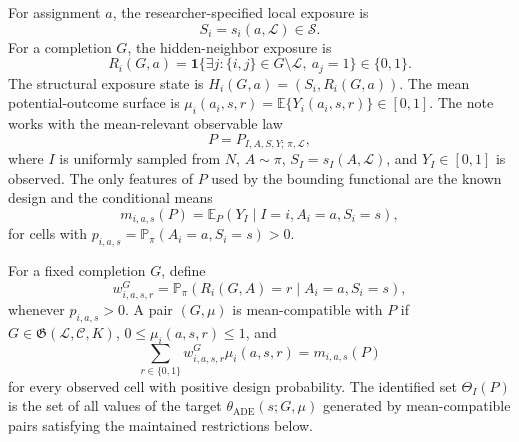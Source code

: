 \documentclass[11pt]{article}
\newcommand{\E}{\mathbb{E}}
\renewcommand{\Pr}{\mathbb{P}}
\newcommand{\one}{\mathbf{1}}
\theoremstyle{definition}
\theoremstyle{plain}
\theoremstyle{remark}
\begin{document}
For assignment \(a\), the researcher-specified local exposure is
\[
S_i=s_i(a,\mathcal L)\in\mathcal S.
\]
For a completion \(G\), the hidden-neighbor exposure is
\[
R_i(G,a)=
\one\{\exists j:\{i,j\}\in G\setminus\mathcal L,\ a_j=1\}\in\{0,1\}.
\]
The structural exposure state is \(H_i(G,a)=(S_i,R_i(G,a))\).  The mean
potential-outcome surface is
\(\mu_i(a_i,s,r)=\E\{Y_i(a_i,s,r)\}\in[0,1]\).  The note works with the
mean-relevant observable law
\[
P=P_{I,A,S,Y;\,\pi,\mathcal L},
\]
where \(I\) is uniformly sampled from \(N\), \(A\sim\pi\), \(S_I=s_I(A,\mathcal L)\),
and \(Y_I\in[0,1]\) is observed.  The only features of \(P\) used by the
bounding functional are the known design and the conditional means
\[
m_{i,a,s}(P)=\E_P(Y_I\mid I=i,A_i=a,S_i=s),
\]
for cells with \(p_{i,a,s}=\Pr_\pi(A_i=a,S_i=s)>0\).

For a fixed completion \(G\), define
\[
w^G_{i,a,s,r}
=\Pr_\pi(R_i(G,A)=r\mid A_i=a,S_i=s),
\]
whenever \(p_{i,a,s}>0\).  A pair \((G,\mu)\) is mean-compatible with \(P\) if
\(G\in\mathfrak G(\mathcal L,\mathcal C,K)\), \(0\le \mu_i(a,s,r)\le1\), and
\[
\sum_{r\in\{0,1\}}w^G_{i,a,s,r}\mu_i(a,s,r)=m_{i,a,s}(P)
\]
for every observed cell with positive design probability.  The identified set
\(\Theta_I(P)\) is the set of all values of the target
\(\theta_{\mathrm{ADE}}(s;G,\mu)\) generated by mean-compatible pairs satisfying
the maintained restrictions below.
\end{document}
